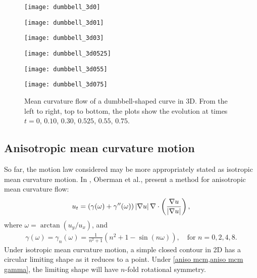 \begin{figure}[htb!]
        \centering
\begin{minipage}{0.48\textwidth}
        \texttt{[image: dumbbell\_3d0]}
\end{minipage}%
\begin{minipage}{0.48\textwidth}
        \texttt{[image: dumbbell\_3d01]}
\end{minipage}
\begin{minipage}{0.48\textwidth}
        \texttt{[image: dumbbell\_3d03]}
\end{minipage}%
\begin{minipage}{0.48\textwidth}
        \texttt{[image: dumbbell\_3d0525]}
\end{minipage}
\begin{minipage}{0.48\textwidth}
        \texttt{[image: dumbbell\_3d055]}
\end{minipage}%
\begin{minipage}{0.48\textwidth}
        \texttt{[image: dumbbell\_3d075]}
\end{minipage}
\caption[Mean curvature flow of a dumbbell-shaped curve in 3D]{Mean curvature flow of a dumbbell-shaped curve in 3D. From the left to right, top to bottom, the plots show the evolution at times $t=0$, $0.10$, $0.30$, $0.525$, $0.55$, $0.75$.}
\label{fig:mcm 3d dumbbell}
\end{figure}


\subsection{Anisotropic mean curvature motion}
So far, the motion law considered may be more appropriately stated as isotropic mean curvature motion. In \cite{oberman2011aniso}, Oberman et al., present a method for anisotropic mean curvature flow: 
\begin{align}
        u_t = (\gamma(\omega) + \gamma''(\omega))\left|\nabla u\right| \nabla \cdot \left( \frac{\nabla u}{\left|\nabla u\right|} \right),
\label{aniso mcm}
\end{align}
where $\omega = \arctan(u_y/u_x)$, and 
\begin{align}
        \gamma(\omega) 
= \gamma_n(\omega) 
= \frac{1}{n^2+1}(n^2 + 1 - \sin(n\omega)), 
\quad\text{for } n = 0,2,4,8.
\label{aniso mcm gamma}
\end{align}
Under isotropic mean curvature motion, a simple closed contour in 2D has a circular limiting shape as it reduces to a point. Under \cref{aniso mcm,aniso mcm gamma}, the limiting shape will have $n$-fold rotational symmetry.

